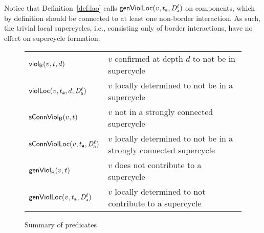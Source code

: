 Notice that Definition~\ref{def:lao} calls $\locFormViol{v}{t_\act}{\act}{\l}$ on components, which by definition should be connected to at least one non-border interaction. 
As such, the trivial local supercycles, i.e., consisting only of border interactions, have no effect on supercycle formation. 

\begin{figure}[t]

\begin{tabular}{|l|l|}
\hline
$\scViol{v}{d}{t}$  & $v$ confirmed at depth $d$ to not be in supercycle\\ 
$\locScViol{v}{d}{t_\act}{\act}{\l}$ & $v$ locally determined to not be in a supercycle\\

$\connViol{v}{t}$ & $v$ not in a strongly connected supercycle \\

$\locConnViol{v}{t_\act}{\act}{\l}$ & $v$ locally determined to not be in a strongly connected supercycle \\

$\formViol{v}{t}$ & $v$ does not contribute to a supercycle\\

$\locFormViol{v}{t_\act}{\act}{\l}$ & $v$ locally determined to not contribute to a supercycle\\

\hline
\end{tabular}

\caption{Summary of predicates}
\label{fig:summaryPredicates}
\end{figure}


